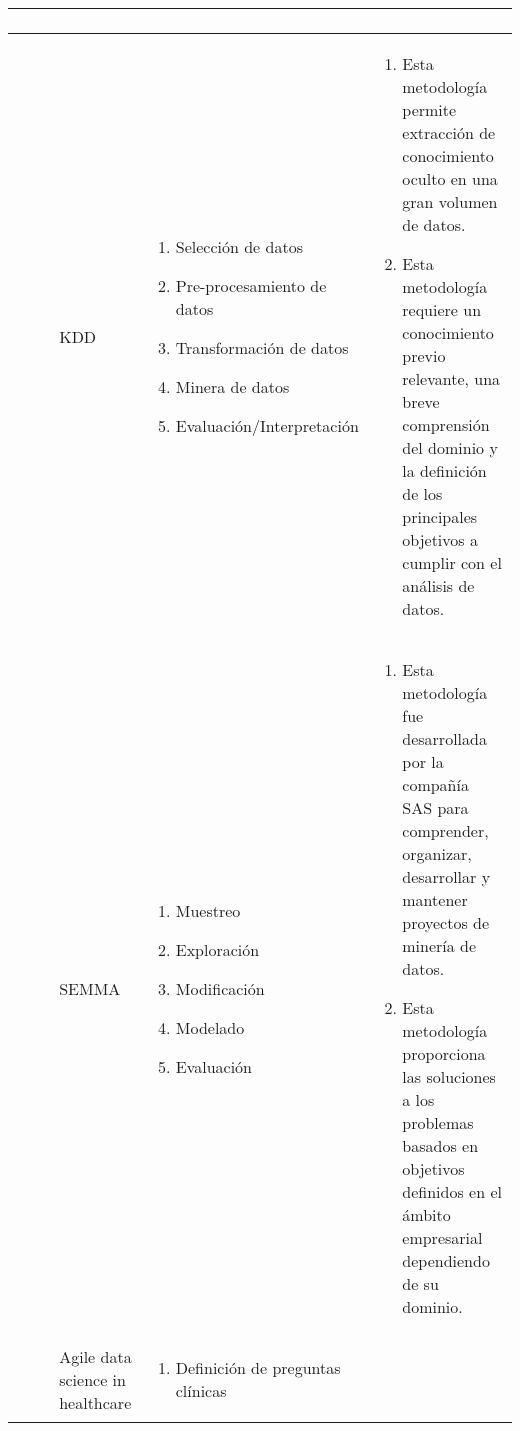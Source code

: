 \begin{table*}
\begin{threeparttable}
\begin{tabular}{ p{2cm} p{4cm} p{5cm} p{6cm}  }
\begin{enumerate}
			\end{enumerate}
			\\ \hline
			\citep{Safhi2019}
			& KDD
			&  \begin{enumerate}
				\item Selección de datos  
				\item Pre-procesamiento de datos 
				\item Transformación de datos
				\item Minera de datos 
				\item Evaluación/Interpretación
			\end{enumerate}
			& \begin{enumerate}
				\item Esta metodología permite extracción de conocimiento oculto en una gran volumen de datos. 
				\item Esta metodología requiere un conocimiento previo relevante, una breve comprensión del dominio y la definición de los principales objetivos a cumplir con el análisis de datos. 
			\end{enumerate}
			\\ \hline
			\citep{Shafique2014}
			& SEMMA
			&  \begin{enumerate}
				\item Muestreo 
				\item Exploración
				\item Modificación
				\item Modelado
				\item Evaluación
			\end{enumerate}
			& \begin{enumerate}
				\item Esta metodología fue desarrollada por la compañía SAS para comprender, organizar, desarrollar y mantener proyectos de minería de datos.
				\item Esta metodología proporciona las soluciones a los problemas basados en objetivos definidos en el ámbito empresarial dependiendo de su dominio.
			\end{enumerate}
			\\ \hline
			\citep{Lei2020}
			& Agile data science in healthcare 
			&  \begin{enumerate}
				\item Definición de preguntas clínicas 

\end{enumerate}
\end{tabular}
\end{threeparttable}
\end{table*}
